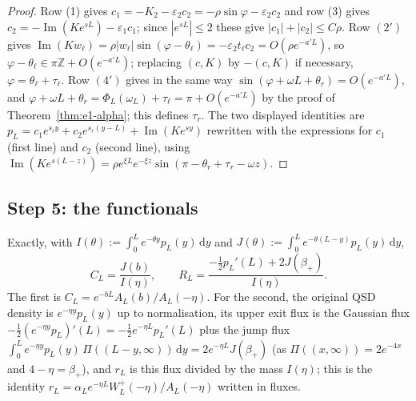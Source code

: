 \documentclass[11pt,a4paper]{article}
\theoremstyle{definition}
\theoremstyle{remark}
\newcommand{\1}{\mathbf 1}
\newcommand{\dd}{\,\mathrm d}
\begin{document}
\begin{proof}
Row (1) gives $c_1=-K_2-\varepsilon_2c_2=-\rho\sin\varphi-\varepsilon_2c_2$ and row (3) gives
$c_2=-\operatorname{Im}(Ke^{sL})-\varepsilon_1c_1$; since $|e^{sL}|\le2$ these give $|c_1|+|c_2|\le C\rho$.
Row $(2')$ gives $\operatorname{Im}(Kw_\ell)=\rho|w_\ell|\sin(\varphi-\theta_\ell)=-\varepsilon_2t_\ell c_2=O(\rho e^{-a'L})$,
so $\varphi-\theta_\ell\in\pi\mathbb Z+O(e^{-a'L})$; replacing $(c,K)$ by $-(c,K)$ if
necessary, $\varphi=\theta_\ell+\tau_\ell$. Row $(4')$ gives in the same way
$\sin(\varphi+\omega L+\theta_r)=O(e^{-a'L})$, and
$\varphi+\omega L+\theta_r=\Phi_L(\omega_L)+\tau_\ell=\pi+O(e^{-a'L})$ by the proof of
Theorem~\ref{thm:e1-alpha}; this defines $\tau_r$. The two displayed identities are
$p_L=c_1e^{s_\ell y}+c_2e^{s_r(y-L)}+\operatorname{Im}(Ke^{sy})$ rewritten with the
expressions for $c_1$ (first line) and $c_2$ (second line), using
$\operatorname{Im}(Ke^{s(L-z)})=\rho e^{\xi L}e^{-\xi z}\sin(\pi-\theta_r+\tau_r-\omega z)$.
\end{proof}

\subsection*{Step 5: the functionals}

Exactly, with $I(\theta):=\int_0^Le^{-\theta y}p_L(y)\dd y$ and
$J(\theta):=\int_0^Le^{-\theta(L-y)}p_L(y)\dd y$,
\[
C_L=\frac{J(b)}{I(\eta)},\qquad
R_L=\frac{-\tfrac12p_L'(L)+2J(\beta_+)}{I(\eta)} .
\]
The first is $C_L=e^{-bL}A_L(b)/A_L(-\eta)$. For the second, the original QSD density is
$e^{-\eta y}p_L(y)$ up to normalisation, its upper exit flux is the Gaussian flux
$-\frac12(e^{-\eta y}p_L)'(L)=-\frac12e^{-\eta L}p_L'(L)$ plus the jump flux
$\int_0^Le^{-\eta y}p_L(y)\,\Pi((L-y,\infty))\dd y=2e^{-\eta L}J(\beta_+)$ (as $\Pi((x,\infty))=2e^{-4x}$
and $4-\eta=\beta_+$), and $r_L$ is this flux divided by the mass $I(\eta)$; this is the
identity $r_L=\alpha_Le^{-\eta L}W_L^+(-\eta)/A_L(-\eta)$ written in fluxes.
\end{document}
